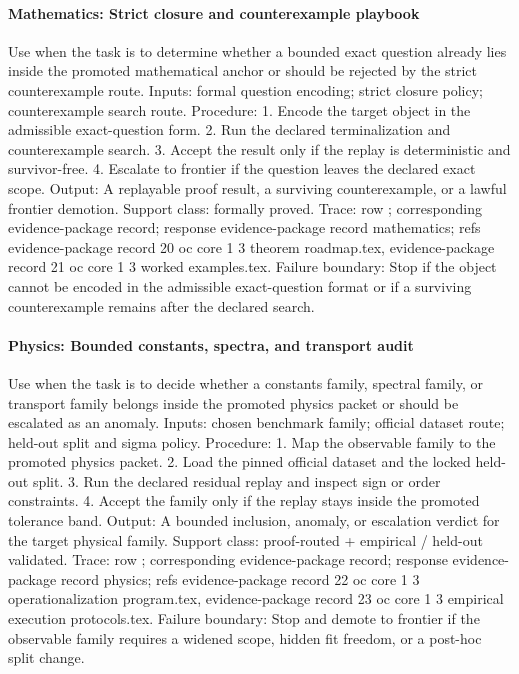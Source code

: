 \paragraph{Mathematics: Strict closure and counterexample playbook}
Use when the task is to determine whether a bounded exact question already lies inside the promoted mathematical anchor or should be rejected by the strict counterexample route.
Inputs: formal question encoding; \allowbreak strict closure policy; \allowbreak counterexample search route.
Procedure: 1. Encode the target object in the admissible exact-question form. 2. Run the declared terminalization and counterexample search. 3. Accept the result only if the replay is deterministic and survivor-free. 4. Escalate to frontier if the question leaves the declared exact scope.
Output: A replayable proof result, a surviving counterexample, or a lawful frontier demotion.
Support class: formally proved.
Trace: row ; corresponding evidence-package record; \allowbreak response evidence-package record mathematics; \allowbreak refs evidence-package record 20 oc core 1 3 theorem roadmap.tex, \allowbreak evidence-package record 21 oc core 1 3 worked examples.tex.
Failure boundary: Stop if the object cannot be encoded in the admissible exact-question format or if a surviving counterexample remains after the declared search.

\paragraph{Physics: Bounded constants, spectra, and transport audit}
Use when the task is to decide whether a constants family, spectral family, or transport family belongs inside the promoted physics packet or should be escalated as an anomaly.
Inputs: chosen benchmark family; \allowbreak official dataset route; \allowbreak held-out split and sigma policy.
Procedure: 1. Map the observable family to the promoted physics packet. 2. Load the pinned official dataset and the locked held-out split. 3. Run the declared residual replay and inspect sign or order constraints. 4. Accept the family only if the replay stays inside the promoted tolerance band.
Output: A bounded inclusion, anomaly, or escalation verdict for the target physical family.
Support class: proof-routed + empirical / held-out validated.
Trace: row ; corresponding evidence-package record; \allowbreak response evidence-package record physics; \allowbreak refs evidence-package record 22 oc core 1 3 operationalization program.tex, \allowbreak evidence-package record 23 oc core 1 3 empirical execution protocols.tex.
Failure boundary: Stop and demote to frontier if the observable family requires a widened scope, hidden fit freedom, or a post-hoc split change.

